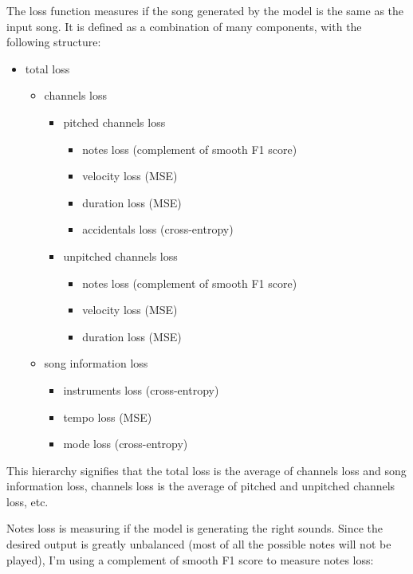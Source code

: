 \documentclass[en]{pracamgr}
\begin{document}
The loss function measures if the song generated by the model is the same as the input song. It is defined as a combination of many components, with the following structure:
\begin{itemize}
    \item total loss
	\begin{itemize}
	    \item channels loss
		\begin{itemize}
			\item pitched channels loss
            \begin{itemize}
                \item notes loss (complement of smooth F1 score)
                \item velocity loss (MSE)
                \item duration loss (MSE)
                \item accidentals loss (cross-entropy)
            \end{itemize}
			\item unpitched channels loss
            \begin{itemize}
                \item notes loss (complement of smooth F1 score)
                \item velocity loss (MSE)
                \item duration loss (MSE)
            \end{itemize}
		\end{itemize}
        \item song information loss
        \begin{itemize}
            \item instruments loss (cross-entropy)
            \item tempo loss (MSE)
            \item mode loss (cross-entropy)
        \end{itemize}
	\end{itemize}
\end{itemize}

This hierarchy signifies that the total loss is the average of channels loss and song information loss, channels loss is the average of pitched and unpitched channels loss, etc.

Notes loss is measuring if the model is generating the right sounds.
Since the desired output is greatly unbalanced (most of all the possible notes will not be played), I'm using a complement of smooth F1 score to measure notes loss:
\nopagebreak
\end{document}
